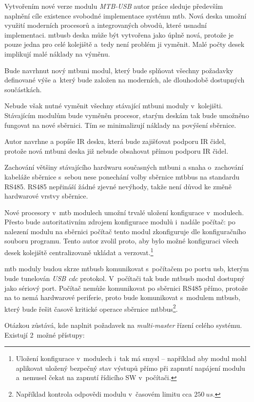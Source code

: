 Vytvořením nové verze modulu \textit{MTB-USB} autor práce sleduje především
naplnění cíle existence svobodné implementace systému \gls{mtb}. Nová deska
umožní využití moderních procesorů a integrovaných obvodů, které usnadní
implementaci. \gls{mtbusb} deska může být vytvořena jako úplně nová, protože je
pouze jedna pro celé kolejiště a~tedy není problém ji vyměnit. Malé počty desek
implikují malé náklady na výměnu.

Bude navrhnut nový \gls{mtbuni} modul, který bude splňovat všechny požadavky
definované výše a~který bude založen na moderních, ale dlouhodobě dostupných
součástkách.

Nebude však nutné vyměnit všechny stávající \gls{mtbuni} moduly v~kolejišti.
Stávajícím modulům bude vyměněn procesor, starým deskám tak bude umožněno
fungovat na nové sběrnici. Tím se minimalizují náklady na povýšení sběrnice.

Autor navrhne a popíše IR desku, která bude zajišťovat podporu IR čidel,
protože nová \gls{mtbuni} deska již nebude obsahovat přímou podporu IR čidel.

Zachování většiny stávajícího hardwaru současných \gls{mtbuni} a snaha
o~zachování kabeláže sběrnice s~sebou nese ponechání volby sběrnice \gls{mtbbus}
na standardu RS485. RS485 nepřináší žádné zjevné nevýhody, takže není důvod
ke změně hardwarové vrstvy sběrnice.

Nové procesory v~\gls{mtb} modulech umožní trvalé uložení konfigurace v~modulech.
Přesto bude autoritativním zdrojem konfigurace modulů i~nadále počítač: po
nalezení modulu na sběrnici počítač tento modul zkonfiguruje dle konfiguračního
souboru programu. Tento autor zvolil proto, aby bylo možné  konfiguraci všech
desek kolejiště centralizovaně ukládat a verzovat.\footnote{Uložení konfigurace
v~modulech i~tak má smysl – například aby modul mohl aplikovat uložený bezpečný
stav výstupů přímo při zapnutí napájení modulu a~nemusel čekat na zapnutí
řídicího SW v~počítači.}

\gls{mtb} moduly budou skrze \gls{mtbusb} komunikovat s~počítačem po portu
\gls{usb}, kterým bude tunelován \textit{USB \gls{cdc}} protokol. V~počítači tak bude
\gls{mtbusb} modul dostupný jako sériový port. Počítač nemůže komunikovat po
sběrnici RS485 přímo, protože na to nemá hardwarové periferie, proto bude
komunikovat s~modulem \gls{mtbusb}, který bude řešit časově kritické operace
sběrnice \gls{mtbbus}\footnote{Například kontrola odpovědi modulu v~časovém
limitu cca $250~us$.}.

Otázkou zůstává, kde naplnit požadavek na \textit{multi-master} řízení celého
systému. Existují 2~možné přístupy:

